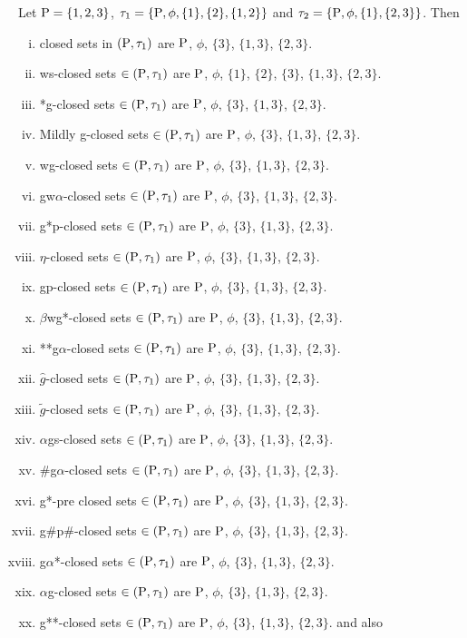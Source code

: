 \begin{exm}\label{exm2.2.17}
Let $\mathrm{P} = \{1, 2, 3\}$, $\tau_{1} = \{\mathrm{P}, \phi, \{1\}, \{2\}, \{1, 2\}\}$ and $\tau_{2} = \{\TSP, \phi, \{1\},\break \{2, 3\}\}$. Then
\begin{enumerate}[(i)]
\item closed sets in $(\mathrm{P}, \tau_{1})$ are $\mathrm{P}$, $\phi$, $\{3\}$, $\{1, 3\}$, $\{2, 3\}$.
\item ws-closed sets $\in(\mathrm{P}, \tau_{1})$ are $\mathrm{P}$, $\phi$, $\{1\}$, $\{2\}$, $\{3\}$, $\{1, 3\}$, $\{2, 3\}$.
\item *g-closed sets $\in(\mathrm{P}, \tau_{1})$ are $\mathrm{P}$, $\phi$, $\{3\}$, $\{1, 3\}$, $\{2, 3\}$.
\item Mildly g-closed sets $\in(\mathrm{P}, \tau_{1})$ are $\mathrm{P}$, $\phi$, $\{3\}$, $\{1, 3\}$, $\{2, 3\}$.
\item wg-closed sets $\in(\mathrm{P}, \tau_{1})$ are $\mathrm{P}$, $\phi$, $\{3\}$, $\{1, 3\}$, $\{2, 3\}$.
\item gw$\alpha$-closed sets $\in(\mathrm{P}, \tau_{1})$ are $\mathrm{P}$, $\phi$, $\{3\}$, $\{1, 3\}$, $\{2, 3\}$.
\item g*p-closed sets $\in(\mathrm{P}, \tau_{1})$ are $\mathrm{P}$, $\phi$, $\{3\}$, $\{1, 3\}$, $\{2, 3\}$.
\item $\eta$-closed sets $\in(\mathrm{P}, \tau_{1})$ are $\mathrm{P}$, $\phi$, $\{3\}$, $\{1, 3\}$, $\{2, 3\}$.
\item gp-closed sets $\in(\mathrm{P}, \tau_{1})$ are $\mathrm{P}$, $\phi$, $\{3\}$, $\{1, 3\}$, $\{2, 3\}$.
\item $\beta$wg*-closed sets $\in(\mathrm{P}, \tau_{1})$ are $\mathrm{P}$, $\phi$, $\{3\}$, $\{1, 3\}$, $\{2, 3\}$.
\item {*}{*}g$\alpha$-closed sets $\in(\mathrm{P}, \tau_{1})$ are $\mathrm{P}$, $\phi$, $\{3\}$, $\{1, 3\}$, $\{2, 3\}$.
\item $\hat{g}$-closed sets $\in(\mathrm{P}, \tau_{1})$ are $\mathrm{P}$, $\phi$, $\{3\}$, $\{1, 3\}$, $\{2, 3\}$.
\item $\tilde{g}$-closed sets $\in(\mathrm{P}, \tau_{1})$ are $\mathrm{P}$, $\phi$, $\{3\}$, $\{1, 3\}$, $\{2, 3\}$.
\item $\alpha$gs-closed sets $\in(\mathrm{P}, \tau_{1})$ are $\mathrm{P}$, $\phi$, $\{3\}$, $\{1, 3\}$, $\{2, 3\}$.
\item \#g$\alpha$-closed sets $\in(\mathrm{P}, \tau_{1})$ are $\mathrm{P}$, $\phi$, $\{3\}$, $\{1, 3\}$, $\{2, 3\}$.
\item g*-pre closed sets $\in(\mathrm{P}, \tau_{1} )$ are $\mathrm{P}$, $\phi$, $\{3\}$, $\{1, 3\}$, $\{2, 3\}$.
\item g\#p\#-closed sets $\in(\mathrm{P}, \tau_{1} )$ are $\mathrm{P}$, $\phi$, $\{3\}$, $\{1, 3\}$, $\{2, 3\}$.
\item g$\alpha$*-closed sets $\in(\mathrm{P}, \tau_{1} )$ are $\mathrm{P}$, $\phi$, $\{3\}$, $\{1, 3\}$, $\{2, 3\}$.
\item $\alpha$g-closed sets $\in(\mathrm{P}, \tau_{1})$ are $\mathrm{P}$, $\phi$, $\{3\}$, $\{1, 3\}$, $\{2, 3\}$.
\item g{*}{*}-closed sets $\in(\mathrm{P}, \tau_{1})$ are $\mathrm{P}$, $\phi$, $\{3\}$, $\{1, 3\}$, $\{2, 3\}$. and also
\end{enumerate}


\end{exm}
